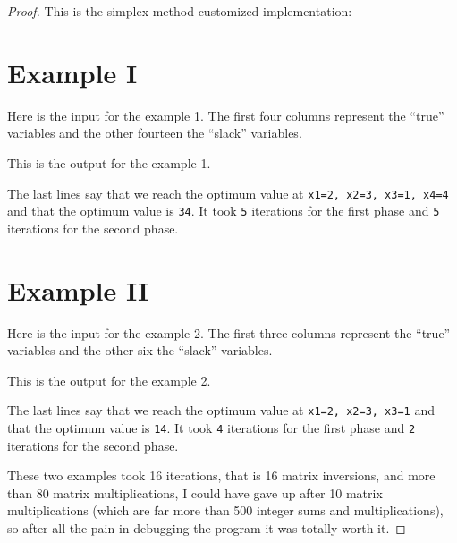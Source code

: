 \begin{proof}
    This is the simplex method customized implementation:
    \small
    
    \normalsize
    
    \newpage
    \section{Example I}

    
    Here is the input for the example 1. The first four columns represent the ``true'' variables and the other fourteen the ``slack'' variables.
    \small
    
    \normalsize
    \pn
    \pn
    
    This is the output for the example 1.
    \small
    
    \normalsize
    The last lines say that we reach the optimum value at \texttt{x1=2, x2=3, x3=1, x4=4} and that the optimum value is \texttt{34}.
    It took \texttt{5} iterations for the first phase and \texttt{5} iterations for the second phase.
    \newpage
    
    
    \section{Example II}
    Here is the input for the example 2. The first three columns represent the ``true'' variables and the other six the ``slack'' variables.
    \small
    
    \normalsize
    \pn
    \pn
       
    This is the output for the example 2.
    \small
    
    \normalsize
    The last lines say that we reach the optimum value at \texttt{x1=2, x2=3, x3=1} and that the optimum value is \texttt{14}.
    It took \texttt{4} iterations for the first phase and \texttt{2} iterations for the second phase.\pn
    
    These two examples took 16 iterations, that is 16 matrix inversions, and more than 80 matrix multiplications, I could have gave up
    after 10 matrix multiplications (which are far more than 500 integer sums and multiplications), so after all the pain in debugging the 
    program it was totally worth it.
\end{proof}